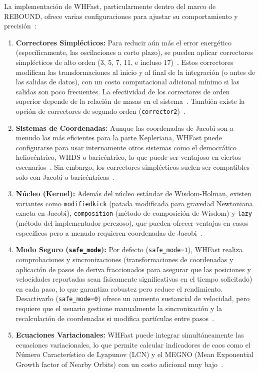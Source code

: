 La implementación de WHFast, particularmente dentro del marco de REBOUND, ofrece varias configuraciones para ajustar su comportamiento y precisión~\cite{Rein2012, ReboundIntegratorsDoc}:
\begin{enumerate}
    \item \textbf{Correctores Simplécticos:} Para reducir aún más el error energético (específicamente, las oscilaciones a corto plazo), se pueden aplicar correctores simplécticos de alto orden (3, 5, 7, 11, e incluso 17)~\cite{ReinTamayo2015, Wisdom1996}. Estos correctores modifican las transformaciones al inicio y al final de la integración (o antes de las salidas de datos), con un costo computacional adicional mínimo si las salidas son poco frecuentes. La efectividad de los correctores de orden superior depende de la relación de masas en el sistema~\cite{ReinTamayo2015}. También existe la opción de correctores de segundo orden (\texttt{corrector2})~\cite{ReboundIntegratorsDoc}.
    \item \textbf{Sistemas de Coordenadas:} Aunque las coordenadas de Jacobi son a menudo las más eficientes para la parte Kepleriana, WHFast puede configurarse para usar internamente otros sistemas como el democrático heliocéntrico, WHDS o baricéntrico, lo que puede ser ventajoso en ciertos escenarios~\cite{ReboundIntegratorsDoc, Javaheri2023}. Sin embargo, los correctores simplécticos suelen ser compatibles solo con Jacobi o baricéntricas~\cite{ReboundIntegratorsDoc, Javaheri2023}.
    \item \textbf{Núcleo (Kernel):} Además del núcleo estándar de Wisdom-Holman, existen variantes como \texttt{modifiedkick} (patada modificada para gravedad Newtoniana exacta en Jacobi), \texttt{composition} (método de composición de Wisdom) y \texttt{lazy} (método del implementador perezoso), que pueden ofrecer ventajas en casos específicos pero a menudo requieren coordenadas de Jacobi~\cite{ReboundIntegratorsDoc}.
    \item \textbf{Modo Seguro (\texttt{safe\_mode}):} Por defecto (\texttt{safe\_mode=1}), WHFast realiza comprobaciones y sincronizaciones (transformaciones de coordenadas y aplicación de pasos de deriva fraccionados para asegurar que las posiciones y velocidades reportadas sean físicamente significativas en el tiempo solicitado) en cada paso, lo que garantiza robustez pero reduce el rendimiento. Desactivarlo (\texttt{safe\_mode=0}) ofrece un aumento sustancial de velocidad, pero requiere que el usuario gestione manualmente la sincronización y la recalculación de coordenadas si modifica partículas entre pasos~\cite{ReboundIntegratorsDoc, ReboundWHFastAdvanced}.
    \item \textbf{Ecuaciones Variacionales:} WHFast puede integrar simultáneamente las ecuaciones variacionales, lo que permite calcular indicadores de caos como el Número Característico de Lyapunov (LCN) y el MEGNO (Mean Exponential Growth factor of Nearby Orbits) con un costo adicional muy bajo~\cite{ReinTamayo2015, Rein2012}.
\end{enumerate}

